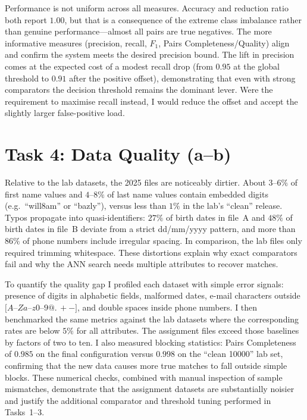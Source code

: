 \documentclass[11pt]{article}
\begin{document}
Performance is not uniform across all measures. Accuracy and reduction ratio both report $1.00$, but that is a consequence of the extreme class imbalance rather than genuine performance---almost all pairs are true negatives. The more informative measures (precision, recall, $F_{1}$, Pairs Completeness/Quality) align and confirm the system meets the desired precision bound. The lift in precision comes at the expected cost of a modest recall drop (from $0.95$ at the global threshold to $0.91$ after the positive offset), demonstrating that even with strong comparators the decision threshold remains the dominant lever. Were the requirement to maximise recall instead, I would reduce the offset and accept the slightly larger false-positive load.

\section*{Task 4: Data Quality (a--b)}
Relative to the lab datasets, the 2025 files are noticeably dirtier. About $3$--$6\%$ of first name values and $4$--$8\%$ of last name values contain embedded digits (e.g.\ ``will8am'' or ``bazly''), versus less than $1\%$ in the lab's ``clean'' release. Typos propagate into quasi-identifiers: $27\%$ of birth dates in file~A and $48\%$ of birth dates in file~B deviate from a strict dd/mm/yyyy pattern, and more than $86\%$ of phone numbers include irregular spacing. In comparison, the lab files only required trimming whitespace. These distortions explain why exact comparators fail and why the ANN search needs multiple attributes to recover matches.

To quantify the quality gap I profiled each dataset with simple error signals: presence of digits in alphabetic fields, malformed dates, e-mail characters outside $[A$--$Z\!a$--$z0$--$9@.\,+-]$, and double spaces inside phone numbers. I then benchmarked the same metrics against the lab datasets where the corresponding rates are below $5\%$ for all attributes. The assignment files exceed those baselines by factors of two to ten. I also measured blocking statistics: Pairs Completeness of $0.985$ on the final configuration versus $0.998$ on the ``clean 10000'' lab set, confirming that the new data causes more true matches to fall outside simple blocks. These numerical checks, combined with manual inspection of sample mismatches, demonstrate that the assignment datasets are substantially noisier and justify the additional comparator and threshold tuning performed in Tasks~1--3.
\end{document}
